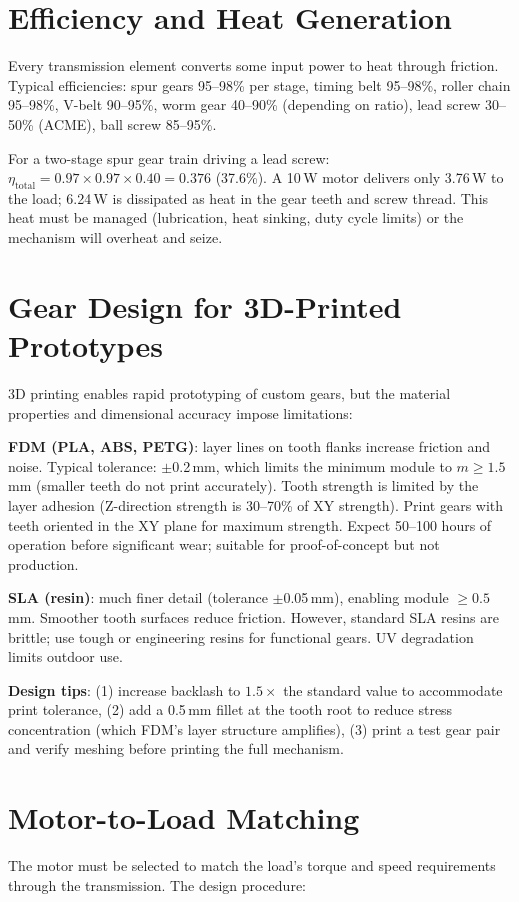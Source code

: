 \documentclass[11pt,letterpaper,twoside,openany]{book}
\begin{document}
\section{Efficiency and Heat Generation}
Every transmission element converts some input power to heat through friction. Typical efficiencies: spur gears 95--98\% per stage, timing belt 95--98\%, roller chain 95--98\%, V-belt 90--95\%, worm gear 40--90\% (depending on ratio), lead screw 30--50\% (ACME), ball screw 85--95\%.

For a two-stage spur gear train driving a lead screw: $\eta_{\text{total}} = 0.97 \times 0.97 \times 0.40 = 0.376$ (37.6\%). A 10\,W motor delivers only 3.76\,W to the load; 6.24\,W is dissipated as heat in the gear teeth and screw thread. This heat must be managed (lubrication, heat sinking, duty cycle limits) or the mechanism will overheat and seize.
\section{Gear Design for 3D-Printed Prototypes}
3D printing enables rapid prototyping of custom gears, but the material properties and dimensional accuracy impose limitations:

\textbf{FDM (PLA, ABS, PETG)}: layer lines on tooth flanks increase friction and noise. Typical tolerance: $\pm$0.2\,mm, which limits the minimum module to $m \geq 1.5$\,mm (smaller teeth do not print accurately). Tooth strength is limited by the layer adhesion (Z-direction strength is 30--70\% of XY strength). Print gears with teeth oriented in the XY plane for maximum strength. Expect 50--100 hours of operation before significant wear; suitable for proof-of-concept but not production.

\textbf{SLA (resin)}: much finer detail (tolerance $\pm$0.05\,mm), enabling module $\geq 0.5$\,mm. Smoother tooth surfaces reduce friction. However, standard SLA resins are brittle; use tough or engineering resins for functional gears. UV degradation limits outdoor use.

\textbf{Design tips}: (1) increase backlash to $1.5\times$ the standard value to accommodate print tolerance, (2) add a 0.5\,mm fillet at the tooth root to reduce stress concentration (which FDM's layer structure amplifies), (3) print a test gear pair and verify meshing before printing the full mechanism.

\section{Motor-to-Load Matching}
The motor must be selected to match the load's torque and speed requirements through the transmission. The design procedure:
\end{document}
